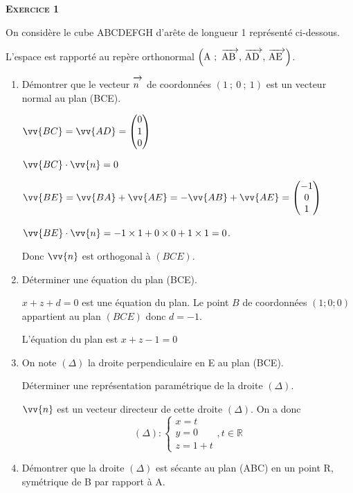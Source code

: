 \documentclass[11pt]{article}
\newcommand{\R}{\mathbb{R}}
\newcommand{\vect}[1]{\mathchoice%
{\overrightarrow{\displaystyle\mathstrut#1\,\,}}%
{\overrightarrow{\textstyle\mathstrut#1\,\,}}%
{\overrightarrow{\scriptstyle\mathstrut#1\,\,}}%
{\overrightarrow{\scriptscriptstyle\mathstrut#1\,\,}}}
\begin{document}
\setlength\parindent{0mm}

\vspace{0,25cm}

\textbf{\textsc{Exercice 1}}

\medskip

On considère le cube ABCDEFGH d'arête de longueur 1 représenté ci-dessous.

L'espace est rapporté au repère orthonormal $\left(\text{A}~;~\vect{\text{AB}},\,\vect{\text{AD}},\,\vect{\text{AE}}\right)$.

\medskip

\begin{enumerate}
  \item Démontrer que le vecteur $\vect{n}$ de coordonnées $(1~;~0~;~1)$
    est un vecteur normal au plan (BCE).

    $\vv{BC} = \vv{AD} = \left(\begin{matrix}0\\1\\0\end{matrix}\right)$

    $\vv{BC} \cdot \vv{n} = 0$

    $\vv{BE} = \vv{BA} + \vv{AE} = -\vv{AB} + \vv{AE} =
    \left(\begin{matrix}-1\\0\\1\end{matrix}\right)$

    $\vv{BE} \cdot \vv{n} = -1\times 1 + 0\times 0 + 1\times 1 = 0$.

    Donc $\vv{n}$ est orthogonal à $(BCE)$.

  \item Déterminer une équation du plan (BCE).

    $x + z + d =0$ est une équation du plan. Le point $B$ de coordonnées
    $(1;0;0)$ appartient au plan $(BCE)$ donc $d = -1$.

    L'équation du plan est $\boxed{x + z - 1 = 0}$

  \item On note $(\Delta)$ la droite perpendiculaire en E au plan (BCE).

    Déterminer une représentation paramétrique de la droite $(\Delta)$.

    $\vv{n}$ est un vecteur directeur de cette droite $(\Delta)$. On a
    donc \[(\Delta): \left\lbrace\begin{matrix}x = t\\y = 0\\ z = 1 +
    t\end{matrix}\right.,t\in\R \]
  \item Démontrer que la droite $(\Delta)$ est sécante au plan (ABC) en
    un point R, symétrique de B par rapport à A.


\end{enumerate}
\end{document}
